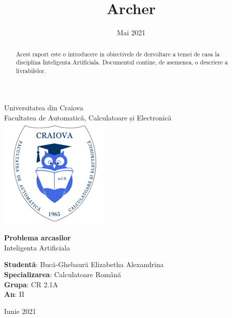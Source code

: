 \documentclass{article}
\title{Archer}
\date{Mai 2021}
\begin{document}
\begin{titlepage}
    \begin{center}
    \Large
        Universitatea din Craiova\\
        Facultatea de Automatică, Calculatoare și Electronică\\
        \vspace*{1cm}
         \includegraphics[scale=0.7]{ace}
        \vspace*{1.5cm}
            
        \Huge{\textbf{Problema arcasilor}\\}
        \vspace{0.3cm}
        \Large
        Inteligenta Artificiala
            
        \vspace{1.5cm}
            
        \Large \textbf{Studentă}: Bucă-Ghebaură Elizabetha Alexandrina
        \\\vspace{0.25cm}
        \Large{\textbf{Specializarea}}: Calculatoare Română\\
        \Large\textbf{Grupa}: CR 2.1A\\
         \Large{\textbf{An}}: II\\
        \vfill
    
        \vspace{0.8cm}
            
        \Large
        Iunie 2021
    \end{center}
\end{titlepage}

\renewcommand*\contentsname{\centering \textcolor{black}{ Introducere cuprins}\\\vspace{1cm} } 
\large \tableofcontents
\vspace{1cm}
\begin{abstract} 
\vspace{0.7cm}
      \large Acest raport este o introducere in obiectivele de dezvoltare a temei de casa la disciplina Inteligenta Artificiala. Documentul contine, de asemenea, o descriere a livrabilelor.
    \end{abstract} 
\end{document}
